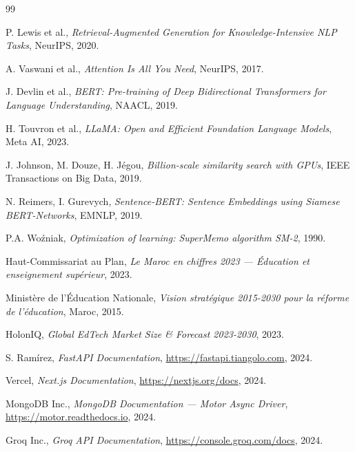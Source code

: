 \documentclass[12pt, a4paper, oneside]{report}
\begin{document}

\begin{thebibliography}{99}

P. Lewis et al., \textit{Retrieval-Augmented Generation for Knowledge-Intensive NLP Tasks}, NeurIPS, 2020.

A. Vaswani et al., \textit{Attention Is All You Need}, NeurIPS, 2017.

J. Devlin et al., \textit{BERT: Pre-training of Deep Bidirectional Transformers for Language Understanding}, NAACL, 2019.

H. Touvron et al., \textit{LLaMA: Open and Efficient Foundation Language Models}, Meta AI, 2023.

J. Johnson, M. Douze, H. Jégou, \textit{Billion-scale similarity search with GPUs}, IEEE Transactions on Big Data, 2019.

N. Reimers, I. Gurevych, \textit{Sentence-BERT: Sentence Embeddings using Siamese BERT-Networks}, EMNLP, 2019.

P.A. Woźniak, \textit{Optimization of learning: SuperMemo algorithm SM-2}, 1990.

Haut-Commissariat au Plan, \textit{Le Maroc en chiffres 2023 — Éducation et enseignement supérieur}, 2023.

Ministère de l'Éducation Nationale, \textit{Vision stratégique 2015-2030 pour la réforme de l'éducation}, Maroc, 2015.

HolonIQ, \textit{Global EdTech Market Size \& Forecast 2023-2030}, 2023.

S. Ramírez, \textit{FastAPI Documentation}, \url{https://fastapi.tiangolo.com}, 2024.

Vercel, \textit{Next.js Documentation}, \url{https://nextjs.org/docs}, 2024.

MongoDB Inc., \textit{MongoDB Documentation — Motor Async Driver}, \url{https://motor.readthedocs.io}, 2024.

Groq Inc., \textit{Groq API Documentation}, \url{https://console.groq.com/docs}, 2024.

\end{thebibliography}
\end{document}
